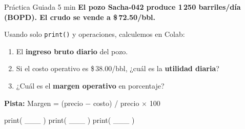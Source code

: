 \documentclass[aspectratio=169, 11pt]{beamer}
\begin{document}
\begin{frame}[fragile]{Práctica Guiada \hfill {\normalsize\color{arcaRed}\faClock\hspace{4pt}5 min}}
  \vspace{-6pt}
  {\small\color{arcaDark}\bfseries
    El pozo Sacha-042 produce 1\,250 barriles/día (BOPD). El crudo se vende a \$\,72.50/bbl.}

  \vspace{4pt}
  {\footnotesize\color{textMuted}
  Usando solo \texttt{print()} y operaciones, calculemos en Colab:}

  \vspace{3pt}
  {\footnotesize
  \begin{enumerate}\setlength{\itemsep}{2pt}
    \item[{\color{arcaRed}\bfseries 1.}]
      El \textbf{ingreso bruto diario} del pozo.
    \item[{\color{arcaRed}\bfseries 2.}]
      Si el costo operativo es \$\,38.00/bbl, ¿cuál es la \textbf{utilidad diaria}?
    \item[{\color{arcaRed}\bfseries 3.}]
      ¿Cuál es el \textbf{margen operativo} en porcentaje?
  \end{enumerate}
  }

  \vspace{4pt}
  {\footnotesize\color{textMuted}
    \faLightbulb[regular]\hspace{4pt}\textbf{Pista:}
    Margen = (precio $-$ costo) / precio $\times$ 100}

  \vspace{4pt}
  \begin{pyblock}[title={\scriptsize\faPlay\hspace{4pt}Tres print, tres respuestas}]
print( ___ )
print( ___ )
print( ___ )
  \end{pyblock}
\end{frame}
\end{document}
